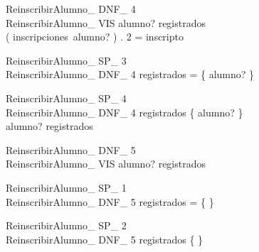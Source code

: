 \documentclass{article}
\begin{document}
\begin{schema}{ReinscribirAlumno\_ DNF\_ 4}\\
 ReinscribirAlumno\_ VIS 
\where
 alumno? \in registrados \\
 ( inscripciones~alumno? ) . 2 = inscripto
\end{schema}


\begin{schema}{ReinscribirAlumno\_ SP\_ 3}\\
 ReinscribirAlumno\_ DNF\_ 4 
\where
 registrados = \{ alumno? \}
\end{schema}


\begin{schema}{ReinscribirAlumno\_ SP\_ 4}\\
 ReinscribirAlumno\_ DNF\_ 4 
\where
 registrados \neq \{ alumno? \} \\
 alumno? \in registrados
\end{schema}


\begin{schema}{ReinscribirAlumno\_ DNF\_ 5}\\
 ReinscribirAlumno\_ VIS 
\where
 alumno? \notin registrados
\end{schema}


\begin{schema}{ReinscribirAlumno\_ SP\_ 1}\\
 ReinscribirAlumno\_ DNF\_ 5 
\where
 registrados = \{ \}
\end{schema}


\begin{schema}{ReinscribirAlumno\_ SP\_ 2}\\
 ReinscribirAlumno\_ DNF\_ 5 
\where
 registrados \neq \{ \}
\end{schema}
\end{document}
